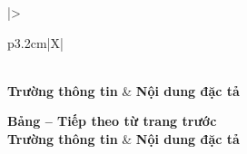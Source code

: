 \begin{xltabular}{\textwidth}{|>{\bfseries\raggedright\arraybackslash}p{3.2cm}|X|}
\caption{Bảng đặc tả chi tiết Use Case UC01: Đọc và tiền xử lý dữ liệu cảm biến} \label{tab:spec_uc01} \\
\hline
\textbf{Trường thông tin} & \textbf{Nội dung đặc tả} \\ \hline
\endfirsthead

%
{{\bfseries Bảng \thetable{} -- Tiếp theo từ trang trước}} \\
\hline
\textbf{Trường thông tin} & \textbf{Nội dung đặc tả} \\ \hline
\endhead

\hline {} \\ \hline
\endfoot

\hline
\endlastfoot


\end{xltabular}
